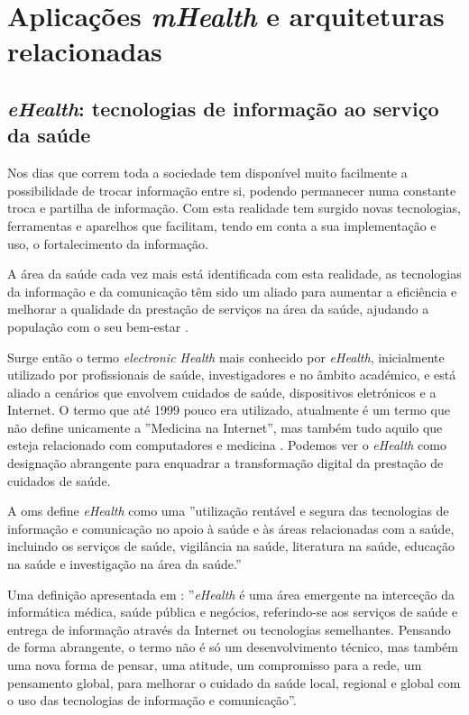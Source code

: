 \chapter{Aplica\c c\~oes \textit{mHealth} e arquiteturas relacionadas}



\section{\textit{eHealth}: tecnologias de informação ao serviço da saúde}
Nos dias que correm toda a sociedade tem dispon\'ivel muito facilmente a possibilidade de trocar informa\c c\~ao entre si, podendo permanecer numa constante troca e partilha de informa\c c\~ao.  Com esta realidade tem surgido novas tecnologias, ferramentas e aparelhos que facilitam, tendo em conta a sua implementa\c c\~ao e uso, o fortalecimento da informa\c c\~ao. 
\par
A \'area da sa\'ude cada vez mais est\'a identificada com esta realidade, as tecnologias da informa\c c\~ao e da comunica\c c\~ao t\^em sido um aliado para aumentar a efici\^encia e melhorar a qualidade da presta\c c\~ao de servi\c cos na área da sa\'ude, ajudando a popula\c c\~ao com o seu bem-estar \cite{ict-healthcare}.
\par
Surge então o termo \textit{electronic Health} mais conhecido por \textit{eHealth}, inicialmente utilizado por profissionais de sa\'ude, investigadores e no \^ambito acad\'emico, e est\'a aliado a cen\'arios que envolvem cuidados de sa\'ude, dispositivos eletr\'onicos e a Internet. O termo que at\'e 1999 pouco era utilizado, atualmente \'e um termo que n\~ao define unicamente a ''Medicina na Internet'', mas tamb\'em tudo aquilo que esteja relacionado com computadores e medicina \cite{ehealth}. Podemos ver o \textit{eHealth} como designação abrangente para enquadrar a transformação digital da prestação de cuidados de saúde.
\par A \gls{oms} define \textit{eHealth} \cite{ehealth_oms} como uma ''utiliza\c c\~ao rent\'avel e segura das tecnologias de informa\c c\~ao e comunica\c c\~ao no apoio \`a sa\'ude e \`as \'areas relacionadas com a sa\'ude, incluindo os servi\c cos de sa\'ude, vigil\^ancia na sa\'ude, literatura na sa\'ude, educa\c c\~ao na sa\'ude e investiga\c c\~ao na \'area da sa\'ude.''
\par
Uma defini\c c\~ao apresentada em \cite{ehealth}: ''\textit{eHealth} \'e uma \'area emergente na interce\c c\~ao da inform\'atica m\'edica, sa\'ude p\'ublica e neg\'ocios, referindo-se aos servi\c cos de sa\'ude e entrega de informa\c c\~ao atrav\'es da Internet ou tecnologias semelhantes. Pensando de forma abrangente, o termo n\~ao \'e s\'o um desenvolvimento t\'ecnico, mas tamb\'em uma nova forma de pensar, uma atitude, um compromisso para a rede, um pensamento global, para melhorar o cuidado da sa\'ude local, regional e global com o uso das tecnologias de informa\c c\~ao e comunica\c c\~ao''.
